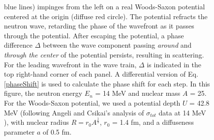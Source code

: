 \documentclass[twocolumn,secnumarabic,amssymb, nobibnotes, aps, prl,
superscriptaddress, nobalancelastpage]{revtex4}
\newcommand{\tots}{\ensuremath{\sigma_{tot}}\,\,}
\begin{document}
\begin{figure}
\begin{minipage}{0.5\textwidth}
{            blue lines) impinges from the left on a real Woods-Saxon
            potential centered at the origin (diffuse red circle). The potential
            refracts the neutron wave,
            retarding the phase of the wavefront as it passes through the
            potential. After escaping the potential, a phase difference $\Delta$ between
            the wave component passing \textit{around} and \textit{through the center}
            of the potential persists, resulting in scattering.
            For the leading wavefront in the wave train, $\Delta$ is indicated in
            the top right-hand corner of each panel. A differential version of
            Eq. \ref{phaseShift} is used to
            calculate the phase shift for each step. In this figure, the neutron
            energy $E_{n}$ = 14 MeV and nuclear mass $A$ = 25. For the Woods-Saxon potential,
            we used a potential depth $U$ = 42.8 MeV (following Angeli and
            Csikai's analysis of \tots data at 14 MeV \cite{Angeli1970}), with nuclear radius $R = 
            r_{0}A^{\frac{1}{3}}$, $r_{0}$ = 1.4 fm, and a diffuseness parameter
        $a$ of 0.5 fm.}
        \label{RamsauerPhaseShiftFigure}
    \end{minipage}
\end{figure}
\end{document}
